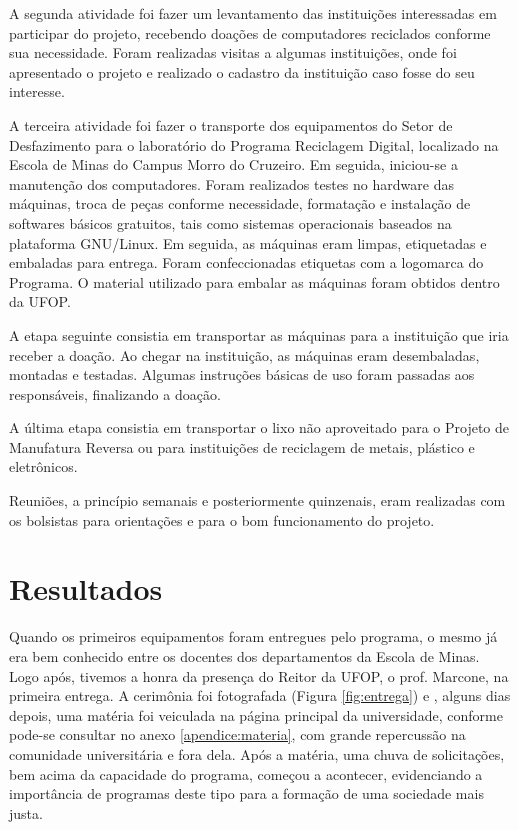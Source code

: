 \documentclass[
	12pt,				%
	openright,			%
	oneside,			%
	a4paper,			%
	english,			%
	spanish,			%
	brazil,				%
	]{abntex2}
\begin{document}
A segunda atividade foi fazer um levantamento das instituições interessadas em participar do projeto, recebendo doações de computadores reciclados conforme sua necessidade. Foram realizadas visitas a algumas instituições, onde foi apresentado o projeto e realizado o cadastro da instituição caso fosse do seu interesse.  

A terceira atividade foi fazer o transporte dos equipamentos do Setor de Desfazimento para o laboratório do Programa Reciclagem Digital, localizado na Escola de Minas do Campus Morro do Cruzeiro.
Em seguida, iniciou-se a manutenção dos computadores. Foram realizados testes no hardware das máquinas, troca de peças conforme necessidade, formatação e instalação de softwares básicos gratuitos, tais como sistemas operacionais baseados na plataforma GNU/Linux. Em seguida, as máquinas eram limpas, etiquetadas e embaladas para entrega. Foram confeccionadas etiquetas com a logomarca do Programa. O material utilizado para embalar as máquinas foram obtidos dentro da UFOP.

A etapa seguinte consistia em transportar as máquinas para a instituição que iria receber a doação. Ao chegar na instituição, as máquinas eram desembaladas, montadas e testadas. Algumas instruções básicas de uso foram passadas aos responsáveis, finalizando a doação. 

A última etapa consistia em transportar o lixo não aproveitado para o Projeto de Manufatura Reversa ou para instituições de reciclagem de metais, plástico e eletrônicos.

Reuniões, a princípio semanais e posteriormente quinzenais, eram realizadas com os bolsistas para orientações e para o bom funcionamento do projeto.
 

\chapter{Resultados}
Quando os primeiros equipamentos foram entregues pelo programa, o mesmo já era bem conhecido entre os docentes dos departamentos da Escola de Minas. Logo após, tivemos a honra da presença do Reitor da UFOP, o prof. Marcone, na primeira entrega. A cerimônia foi fotografada (Figura \ref{fig:entrega}) e , alguns dias depois, uma matéria foi veiculada na página principal da universidade, conforme pode-se consultar no anexo \ref{apendice:materia}, com grande repercussão na comunidade universitária e fora dela. Após a matéria, uma chuva de solicitações, bem acima da capacidade do programa, começou a acontecer, evidenciando a importância de programas deste tipo para a formação de uma sociedade mais justa. 
\end{document}
